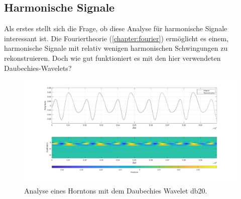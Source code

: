 \begin{refsection}
\subsection{Harmonische Signale}
Als erstes stellt sich die Frage, ob diese Analyse für harmonische Signale interessant ist.
Die Fouriertheorie (\autoref{chapter:fourier}) ermöglicht es einem, harmonische Signale mit relativ wenigen harmonischen Schwingungen zu rekonstruieren.
Doch wie gut funktioniert es mit den hier verwendeten Daubechies-Wavelets?

\begin{figure}
	\centering
	\includegraphics[width=\linewidth]{papers/compress/Bilder/frenchHorn_normal.pdf}
	\caption{Analyse eines Horntons mit dem Daubechies Wavelet db20.}
	\label{fig:horn}
\end{figure}


\end{refsection}
